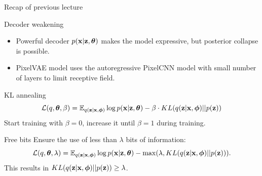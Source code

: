 \begin{frame}{Recap of previous lecture}
	\begin{block}{Decoder weakening}
		\begin{itemize}
			\item Powerful decoder $p(\mathbf{x} | \mathbf{z}, \boldsymbol{\theta})$ makes the model expressive, but posterior collapse is possible.
			\item PixelVAE model uses the autoregressive PixelCNN model with small number of layers to limit receptive field.
		\end{itemize}
	\end{block}
	
	\begin{block}{KL annealing}
		\vspace{-0.6cm}
		\[
		    \mathcal{L}(q, \boldsymbol{\theta}, \beta) = \mathbb{E}_{q(\mathbf{z} | \mathbf{x}, \boldsymbol{\phi})} \log p(\mathbf{x} | \mathbf{z}, \boldsymbol{\theta}) - \beta \cdot KL (q(\mathbf{z} | \mathbf{x}, \boldsymbol{\phi}) || p(\mathbf{z}))
		\]
		Start training with $\beta = 0$, increase it until $\beta = 1$ during training.
	\end{block}
	
	\begin{block}{Free bits}
		Ensure the use of less than $\lambda$ bits of information:
		\[
		    \mathcal{L}(q, \boldsymbol{\theta}, \lambda) = \mathbb{E}_{q(\mathbf{z} | \mathbf{x}, \boldsymbol{\phi})} \log p(\mathbf{x} | \mathbf{z}, \boldsymbol{\theta}) - \max(\lambda, KL (q(\mathbf{z} | \mathbf{x}, \boldsymbol{\phi}) || p(\mathbf{z}))).
		\]
		This results in $KL (q(\mathbf{z} | \mathbf{x}, \boldsymbol{\phi}) || p(\mathbf{z})) \geq \lambda$.
	\end{block}
\end{frame}

